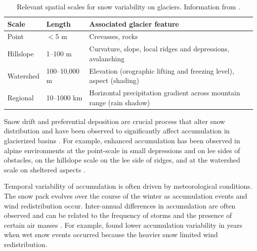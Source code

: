 \documentclass[12pt]{article}
\begin{document}
\begin{table}[]
\centering
\caption{Relevant spatial scales for snow variability on glaciers. Information from \cite{Clark2011}.}
\label{scale}
\begin{tabular}{lll}
\textbf{Scale} & \textbf{Length} & \textbf{Associated glacier feature}                     \\ \hline
Point          & $<$5 m         & Crevasses, rocks                                               \\
Hillslope      & 1--100 m        & Curvature, slope, local ridges and depressions, avalanching        \\
Watershed      & 100--10,000 m   & Elevation (orographic lifting and freezing level), aspect (shading)                                       \\
Regional       & 10--1000 km     & Horizontal precipitation gradient across mountain range (rain shadow)
\end{tabular}
\end{table}

Snow drift and preferential deposition are crucial process that alter snow distribution  \citep{Winstral2002,Mott2008, Lehning2008,Clark2011} and have been observed to significantly affect accumulation in glacierized basins \citep[e.g.][]{Dadic2010}.  For example, enhanced accumulation has been observed in alpine environments at the point-scale in small depressions and on lee sides of obstacles, on the hillslope scale on the lee side of ridges, and at the watershed scale on sheltered aspects \citep{Harrison1986, Bloeschl1992, Mott2008, Winstral2002, Clark2011}. 

Temporal variability of accumulation is often driven by meteorological conditions. The snow pack evolves over the course of the winter as accumulation events and wind redistribution occur. Inter-annual differences in accumulation are often observed and can be related to the frequency of storms and the presence of certain air masses \citep{Taylor1969}. For example, \cite{Pomeroy1999} found lower accumulation variability in years when wet snow events occurred because the heavier snow limited wind redistribution.
\end{document}
